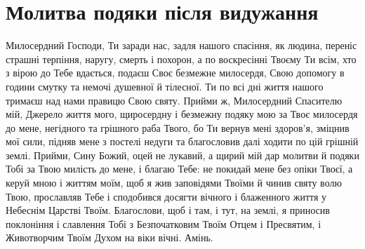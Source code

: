 \documentclass[chapters.tex]{subfiles}
\begin{document}
\section{Молитва подяки після видужання}
Милосердний Господи, Ти заради нас, задля нашого спасіння, як людина, переніс страшні терпіння, наругу, смерть і похорон, а по воскресінні Твоєму Ти всім, хто з вірою до Тебе вдається, подаєш Своє безмежне милосердя, Свою допомогу в години смутку та немочі душевної й тілесної. Ти по всі дні життя нашого тримаєш над нами правицю Свою святу. Прийми ж, Милосердний Спасителю мій, Джерело життя мого, щиросердну і безмежну подяку мою за Твоє милосердя до мене, негідного та грішного раба Твого, бо Ти вернув мені здоров’я, зміцнив мої сили, підняв мене з постелі недуги та благословив далі ходити по цій грішній землі. Прийми, Сину Божий, оцей не лукавий, а щирий мій дар молитви й подяки Тобі за Твою милість до мене, і благаю Тебе: не покидай мене без опіки Твоєї, а керуй мною і життям моїм, щоб я жив заповідями Твоїми й чинив святу волю Твою, прославляв Тебе і сподобився досягти вічного і блаженного життя у Небеснім Царстві Твоїм. Благослови, щоб і там, і тут, на землі, я приносив поклоніння і славлення Тобі з Безпочатковим Твоїм Отцем і Пресвятим, і Животворчим Твоїм Духом на віки вічні. Амінь.
\end{document}
